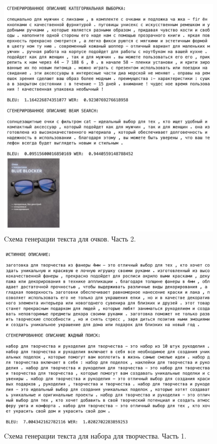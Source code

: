 \documentclass[a4paper,12pt]{extarticle}
\begin{document}
\newpage
\begin{figure}[ht]
	\centering
	\includegraphics[scale=0.4]{test-rnn-glass-2.png}
	\caption{Cхема генерации текста для очков. Часть 2.}
	\label{fig:test-rnn-glass-2}
\end{figure}

\newpage
\begin{figure}[ht]
	\centering
	\includegraphics[scale=0.4]{test-rnn-art-1.png}
	\caption{Cхема генерации текста для набора для творчества. Часть 1.}
	\label{fig:test-rnn-art-1}
\end{figure}
\end{document}
